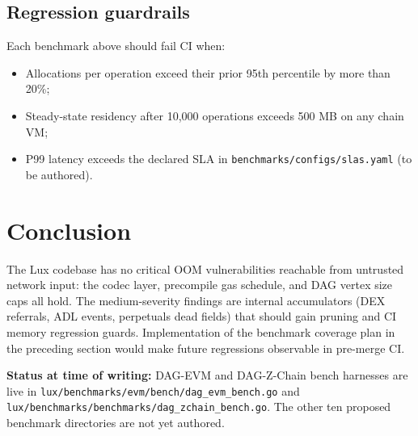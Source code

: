 \documentclass[11pt]{article}
\begin{document}
\subsection{Regression guardrails}

Each benchmark above should fail CI when:
\begin{itemize}
  \item Allocations per operation exceed their prior 95th percentile
    by more than 20\%;
  \item Steady-state residency after 10,000 operations exceeds 500 MB
    on any chain VM;
  \item P99 latency exceeds the declared SLA in
    \texttt{benchmarks/configs/slas.yaml} (to be authored).
\end{itemize}

\section{Conclusion}

The Lux codebase has no critical OOM vulnerabilities reachable from
untrusted network input: the codec layer, precompile gas schedule, and
DAG vertex size caps all hold. The medium-severity findings are
internal accumulators (DEX referrals, ADL events, perpetuals dead
fields) that should gain pruning and CI memory regression guards.
Implementation of the benchmark coverage plan in the preceding section
would make future regressions observable in pre-merge CI.

\textbf{Status at time of writing:} DAG-EVM and DAG-Z-Chain bench
harnesses are live in \texttt{lux/benchmarks/evm/bench/dag\_evm\_bench.go}
and \texttt{lux/benchmarks/benchmarks/dag\_zchain\_bench.go}. The other
ten proposed benchmark directories are not yet authored.
\end{document}
